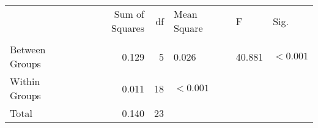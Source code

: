 \begin{tabular}{lrrlll}
\toprule
 & Sum of Squares & df & Mean Square & F & Sig. \\
 &  &  &  &  &  \\
\midrule
Between Groups & 0.129 & 5 & 0.026 & 40.881 & $< 0.001$ \\
Within Groups & 0.011 & 18 & $< 0.001$ &  &  \\
Total & 0.140 & 23 &  &  &  \\
\bottomrule
\end{tabular}
